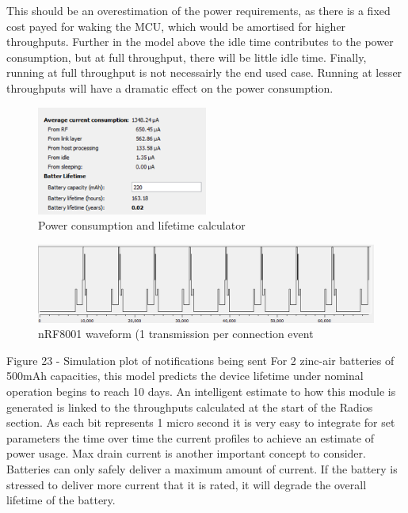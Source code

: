 \documentclass[]{article}
\begin{document}
This should be an overestimation of the power requirements, as there is a fixed cost payed for waking the MCU, which would be amortised for higher throughputs. Further in the model above the idle time contributes to the power consumption, but at full throughput, there will be little idle time. Finally, running at full throughput is not necessairly the end used case. Running at lesser throughputs will have a dramatic effect on the power consumption.
 

\begin{figure}[htb]
	\begin{center}
		\includegraphics[width = 0.5\textwidth]{nrfsim}
	\end{center}
	\caption{Power consumption and lifetime calculator}
	\label{fig:nrfsim}
\end{figure}

\begin{figure}[htb]
	\begin{center}
		\includegraphics[width = 1.1\textwidth]{nrfwave}
	\end{center}
	\caption{nRF8001 waveform (1 transmission per connection event}
	\label{fig:nrfwave}
\end{figure}

 
Figure 23 - Simulation plot of notifications being sent
For 2 zinc-air batteries of 500mAh capacities, this model predicts the device lifetime under nominal operation begins to reach 10 days.  An intelligent estimate to how this module is generated is linked to the throughputs calculated at the start of the Radios section. As each bit represents 1 micro second it is very easy to integrate for set parameters the time over time the current profiles to achieve an estimate of power usage. 
Max drain current is another important concept to consider. Batteries can only safely deliver a maximum amount of current. If the battery is stressed to deliver more current that it is rated, it will degrade the overall lifetime of the battery. 
\end{document}
